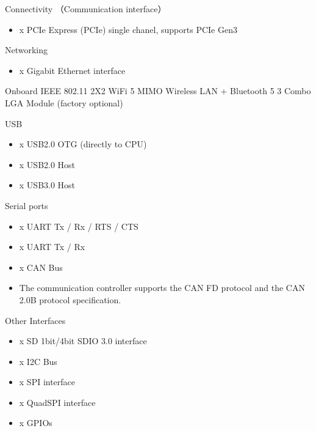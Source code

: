 \documentclass[letterpaper,10pt,openany,english]{sphinxmanual}
\begin{document}
\sphinxAtStartPar
Connectivity （Communication interface）
\begin{itemize}
\item {} 
 x PCIe Express (PCIe) single chanel, supports PCIe Gen3

\end{itemize}

\sphinxAtStartPar
Networking
\begin{itemize}
\item {} 
 x Gigabit Ethernet interface

\end{itemize}

\sphinxAtStartPar
On\sphinxhyphen{}board IEEE 802.11 2X2 WiFi 5 MIMO Wireless LAN + Bluetooth 5 3 Combo LGA Module (factory optional)

\sphinxAtStartPar
USB
\begin{itemize}
\item {} 
 x USB2.0 OTG (directly to CPU)

\item {} 
 x USB2.0 Host

\item {} 
 x USB3.0 Host

\end{itemize}

\sphinxAtStartPar
Serial ports
\begin{itemize}
\item {} 
 x UART Tx / Rx / RTS / CTS

\item {} 
 x UART Tx / Rx

\item {} 
 x CAN Bus

\item {} 
\sphinxAtStartPar
The communication controller supports the CAN FD protocol and the CAN 2.0B protocol specification.

\end{itemize}

\sphinxAtStartPar
Other Interfaces
\begin{itemize}
\item {} 
 x SD 1\sphinxhyphen{}bit/4\sphinxhyphen{}bit SDIO 3.0 interface

\item {} 
 x I2C Bus

\item {} 
 x SPI interface

\item {} 
 x QuadSPI interface

\item {} 
 x GPIOs

\end{itemize}
\end{document}
